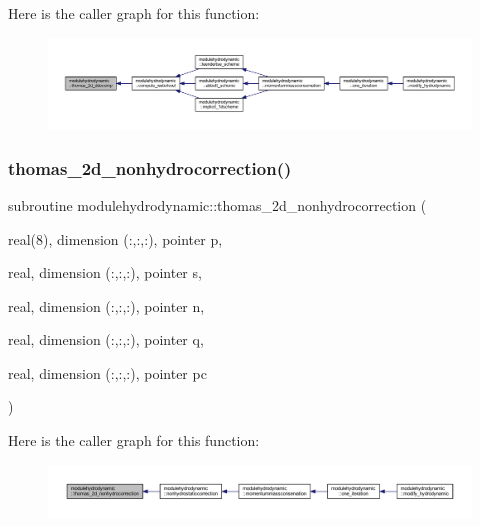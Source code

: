 Here is the caller graph for this function\+:\nopagebreak
\begin{figure}[H]
\begin{center}
\leavevmode
\includegraphics[width=350pt]{namespacemodulehydrodynamic_ac03117b3b11b92ebf56eb60fad884b0b_icgraph}
\end{center}
\end{figure}
\mbox{\label{namespacemodulehydrodynamic_ae703b0f1de9b2461040ee74aa6867ff7}} 
\subsubsection{\texorpdfstring{thomas\+\_\+2d\+\_\+nonhydrocorrection()}{thomas\_2d\_nonhydrocorrection()}}
{\footnotesize\ttfamily subroutine modulehydrodynamic\+::thomas\+\_\+2d\+\_\+nonhydrocorrection (\begin{DoxyParamCaption}\item[{real(8), dimension (\+:,\+:,\+:), pointer}]{p,  }\item[{real, dimension (\+:,\+:,\+:), pointer}]{s,  }\item[{real, dimension (\+:,\+:,\+:), pointer}]{n,  }\item[{real, dimension (\+:,\+:,\+:), pointer}]{q,  }\item[{real, dimension (\+:,\+:,\+:), pointer}]{pc }\end{DoxyParamCaption})\hspace{0.3cm}{\ttfamily [private]}}

Here is the caller graph for this function\+:\nopagebreak
\begin{figure}[H]
\begin{center}
\leavevmode
\includegraphics[width=350pt]{namespacemodulehydrodynamic_ae703b0f1de9b2461040ee74aa6867ff7_icgraph}
\end{center}
\end{figure}
\mbox{\label{namespacemodulehydrodynamic_a5ac5205b827b25fab464de95d2c838bf}} 
